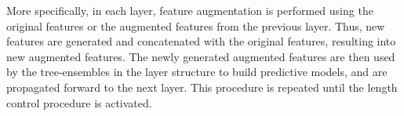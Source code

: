 \documentclass[conference,compsoc]{IEEEtran}
\begin{document}
More specifically, in each layer, feature augmentation is performed using the original features or the augmented features from the previous layer. Thus, new features are generated and concatenated with the original features, resulting into new augmented features. The newly generated augmented features are then used by the tree-ensembles in the layer structure to build predictive models, and are propagated forward to the next layer. This procedure is repeated until the length control procedure is activated. 






%

\end{document}

